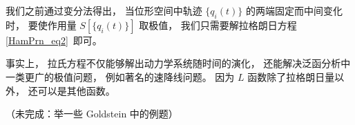 
\begin{issues}
\issueDraft
\end{issues}


我们之前通过变分法得出， 当位形空间中轨迹 $\{q_i(t)\}$ 的两端固定而中间变化时， 要使作用量 $S[\{q_i(t)\}]$ 取极值， 我们只需要解拉格朗日方程\autoref{HamPrn_eq2}~即可。

事实上， 拉氏方程不仅能够解出动力学系统随时间的演化， 还能解决泛函分析中一类更广的极值问题， 例如著名的速降线问题。 因为 $L$ 函数除了拉格朗日量以外， 还可以是其他函数。

（未完成：举一些 Goldstein 中的例题）
